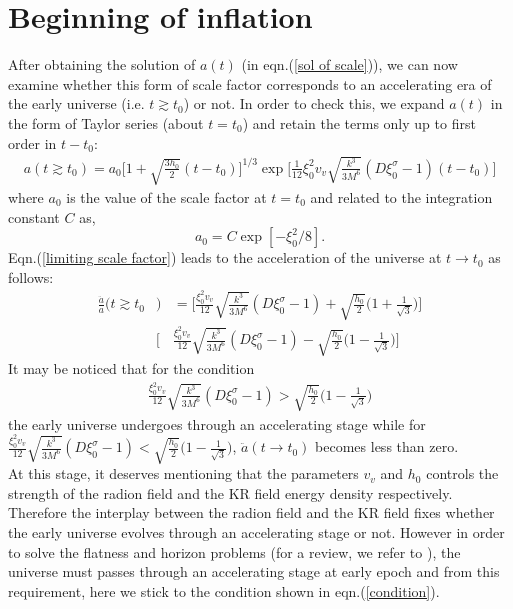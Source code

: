 \documentclass[a4paper]{article}
\begin{document}
\section{Beginning of inflation}
After obtaining the solution of $a(t)$ (in eqn.(\ref{sol of scale})),   
we can now examine whether this form of scale factor corresponds to an accelerating era of the early universe (i.e. $t\gtrsim t_0$)
or not. In order to check this, we expand $a(t)$ in the form of Taylor series (about $t=t_0$) and 
retain the terms only up to first order in $t-t_0$:
\begin{eqnarray}
 a(t\gtrsim t_0)=a_0 \bigg[1 + \sqrt{\frac{3h_0}{2}}(t-t_0)\bigg]^{1/3} 
 \exp{\bigg[\frac{1}{12}\xi_0^2v_v\sqrt{\frac{k^3}{3M^6}}(D\xi_0^{\sigma}-1)(t-t_0)\bigg]}
 \label{limiting scale factor}
\end{eqnarray}
where $a_0$ is the value of the scale factor at $t=t_0$ and related to the integration constant $C$ as,
\begin{equation}
 a_0 = C \exp{[-\xi_0^2/8]}.
 \nonumber
\end{equation}
Eqn.(\ref{limiting scale factor}) leads to the acceleration of the universe at $t \rightarrow t_0$ as follows:
\begin{eqnarray}
 \frac{\ddot{a}}{a}(t\gtrsim t_0&)&= \bigg[\frac{\xi_0^2v_v}{12}\sqrt{\frac{k^3}{3M^6}}(D\xi_0^{\sigma}-1) 
 + \sqrt{\frac{h_0}{2}}\big(1+\frac{1}{\sqrt{3}}\big)\bigg]\nonumber\\ 
 &\bigg[&\frac{\xi_0^2v_v}{12}\sqrt{\frac{k^3}{3M^6}}(D\xi_0^{\sigma}-1) 
 - \sqrt{\frac{h_0}{2}}\big(1-\frac{1}{\sqrt{3}}\big)\bigg]
 \label{limiting acceleration}
\end{eqnarray}
It may be noticed that for the condition
\begin{eqnarray}
\frac{\xi_0^2v_v}{12}\sqrt{\frac{k^3}{3M^6}}(D\xi_0^{\sigma}-1) > \sqrt{\frac{h_0}{2}}\big(1-\frac{1}{\sqrt{3}}\big)
\label{condition}
\end{eqnarray}
the early universe undergoes through an accelerating stage while for 
$\frac{\xi_0^2v_v}{12}\sqrt{\frac{k^3}{3M^6}}(D\xi_0^{\sigma}-1) < \sqrt{\frac{h_0}{2}}\big(1-\frac{1}{\sqrt{3}}\big)$, $\ddot{a}(t\rightarrow t_0)$ 
becomes less than zero.\\
At this stage, it deserves mentioning that the parameters $v_v$ and $h_0$ controls the strength of the radion field and the KR field 
energy density respectively. Therefore the interplay between the radion field and the KR field fixes whether the early universe evolves through an 
accelerating stage or not. However in order to solve the flatness and horizon problems (for a review, we refer to \cite{perkins,watson}), 
the universe must passes through an accelerating stage 
at early epoch and from this requirement, here we stick to the condition shown in eqn.(\ref{condition}).\\
\end{document}
